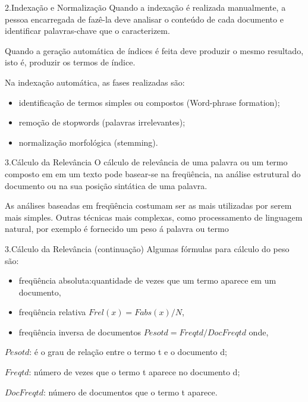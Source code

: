 \documentclass[
  ignorenonframetext,
]{beamer}
\begin{document}
\begin{frame}{2.Indexação e Normalização}
\protect\hypertarget{indexauxe7uxe3o-e-normalizauxe7uxe3o}{}
Quando a indexação é realizada manualmente, a pessoa encarregada de
fazê-la deve analisar o conteúdo de cada documento e identiﬁcar
palavras-chave que o caracterizem.

Quando a geração automática de índices é feita deve produzir o mesmo
resultado, isto é, produzir os termos de índice.

Na indexação automática, as fases realizadas são:

\begin{itemize}[<+->]
\item
  identiﬁcação de termos simples ou compostos (Word-phrase formation);
\item
  remoção de stopwords (palavras irrelevantes);
\item
  normalização morfológica (stemming).
\end{itemize}
\end{frame}

\begin{frame}{3.Cálculo da Relevância}
\protect\hypertarget{cuxe1lculo-da-relevuxe2ncia}{}
O cálculo de relevância de uma palavra ou um termo composto em em um
texto pode basear-se na freqüência, na análise estrutural do documento
ou na sua posição sintática de uma palavra.

As análises baseadas em freqüência costumam ser as mais utilizadas por
serem mais simples. Outras técnicas mais complexas, como processamento
de linguagem natural, por exemplo é fornecido um peso á palavra ou termo
\end{frame}

\begin{frame}{3.Cálculo da Relevância (continuação)}
\protect\hypertarget{cuxe1lculo-da-relevuxe2ncia-continuauxe7uxe3o}{}
Algumas fórmulas para cálculo do peso são:

\begin{itemize}[<+->]
\item
  freqüência absoluta:quantidade de vezes que um termo aparece em um
  documento,
\item
  freqüência relativa \(Frel(x) = Fabs(x) / N\),
\item
  freqüência inversa de documentos \(Pesotd = Freqtd / DocFreqtd\) onde,
\end{itemize}

\(Pesotd\): é o grau de relação entre o termo t e o documento d;

\(Freqtd\): número de vezes que o termo t aparece no documento d;

\(DocFreqtd\): número de documentos que o termo t aparece.
\end{frame}
\end{document}
